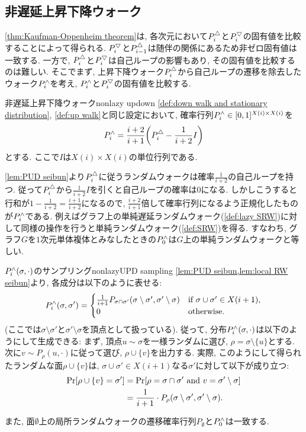 \subsection{非遅延上昇下降ウォーク}
\cref{thm:Kaufman-Oppenheim theorem}は, 各次元において$P^{\triangle}_i$と$P^{\bigtriangledown}_i$の固有値を比較することによって得られる.
$P^{\bigtriangledown}_i$と$P^{\triangle}_{i-1}$は随伴の関係にあるため非ゼロ固有値は一致する.
一方で, $P^{\triangle}_i$と$P^{\bigtriangledown}_i$は自己ループの影響もあり, その固有値を比較するのは難しい.
そこでまず, 上昇下降ウォーク$P^{\triangle}_i$から自己ループの遷移を除去したウォーク$P^{\land}_i$を考え, $P^{\land}_i$と$P^{\bigtriangledown}_i$の固有値を比較する.
\begin{definition}{非遅延上昇下降ウォーク}{nonlazy updown}
    \cref{def:down walk and stationary distribution}, \ref{def:up walk}と同じ設定において, 確率行列$P^{\land}_i \in [0,1]^{X(i) \times X(i)}$を
    \[ \nonlazyPUD_i = \frac{i+2}{i+1}\rbra*{ \PUD_i - \frac{1}{i+2}I } \]
    とする. ここで$I$は$X(i)\times X(i)$の単位行列である.
\end{definition}
\cref{lem:PUD seibun}より$P^{\triangle}_i$に従うランダムウォークは確率$\frac{1}{i+2}$の自己ループを持つ.
従って$P^{\triangle}_i$から$\frac{1}{i+2}I$を引くと自己ループの確率は$0$になる.
しかしこうすると行和が$1-\frac{1}{i+2} = \frac{i+1}{i+2}$になるので, $\frac{i+2}{i+1}$倍して確率行列になるよう正規化したものが$P^{\land}_i$である.
例えばグラフ上の単純遅延ランダムウォーク(\cref{def:lazy SRW})に対して同様の操作を行うと単純ランダムウォーク(\cref{def:SRW})を得る.
すなわち, グラフ$G$を$1$次元単体複体とみなしたときの$P^{\land}_0$は$G$上の単純ランダムウォークと等しい.
\begin{remark}{\texorpdfstring{$P^{\land}_i(\sigma,\cdot)$}{非遅延上昇下降ウォーク}のサンプリング}{nonlazyUPD sampling}
    \cref{lem:PUD seibun,lem:local RW seibun}より, 各成分は以下のように表せる:
    \begin{align*}
        P^{\land}_i(\sigma,\sigma') = \begin{cases}
            \frac{1}{i+1}P_{\sigma\cap \sigma'}(\sigma\setminus\sigma',\sigma'\setminus\sigma)	& \text{if } \sigma\cup\sigma'\in X(i+1),\\
            0 & \text{otherwise}.
        \end{cases}
    \end{align*}
    (ここでは$\sigma\setminus\sigma'$と$\sigma'\setminus\sigma$を頂点として扱っている).
    従って, 分布$P^{\land}_i(\sigma,\cdot)$は以下のようにして生成できる:
    まず, 頂点$u \sim \sigma$を一様ランダムに選び, $\rho = \sigma\setminus\{u\}$とする.
    次に$v\sim P_\rho(u,\cdot)$に従って選び,
    $\rho\cup\{v\}$を出力する.
    実際, このようにして得られたランダムな面$\rho\cup\{v\}$は, $\sigma\cup\sigma'\in X(i+1)$なる$\sigma'$に対して以下が成り立つ:
    \begin{align*}
        \Pr\sbra*{\rho\cup\{v\} = \sigma'} &= \Pr\sbra*{ \rho = \sigma\cap \sigma' \tand v=\sigma'\setminus\sigma } \\
        &= \frac{1}{i+1}\cdot P_{\rho}(\sigma\setminus\sigma',\sigma'\setminus\sigma).
    \end{align*}
    
    また, 面$\emptyset$上の局所ランダムウォークの遷移確率行列$P_\emptyset$と$P^{\land}_0$は一致する.
\end{remark}
